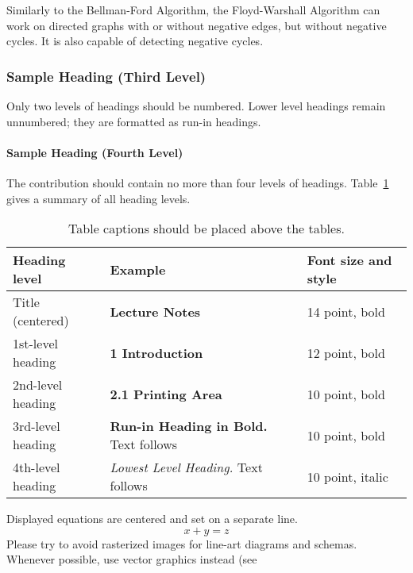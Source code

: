 \documentclass[runningheads]{llncs}
\begin{document}
Similarly to the Bellman-Ford Algorithm, the Floyd-Warshall Algorithm can work on directed graphs with or without negative edges, but without negative cycles. It is also capable of detecting negative cycles.

\subsubsection{Sample Heading (Third Level)} Only two levels of
headings should be numbered. Lower level headings remain unnumbered;
they are formatted as run-in headings.

\paragraph{Sample Heading (Fourth Level)}
The contribution should contain no more than four levels of
headings. Table~\ref{tab1} gives a summary of all heading levels.

\begin{table}
\caption{Table captions should be placed above the
tables.}\label{tab1}
\begin{tabular}{|l|l|l|}
\hline
Heading level &  Example & Font size and style\\
\hline
Title (centered) &  {\Large\bfseries Lecture Notes} & 14 point, bold\\
1st-level heading &  {\large\bfseries 1 Introduction} & 12 point, bold\\
2nd-level heading & {\bfseries 2.1 Printing Area} & 10 point, bold\\
3rd-level heading & {\bfseries Run-in Heading in Bold.} Text follows & 10 point, bold\\
4th-level heading & {\itshape Lowest Level Heading.} Text follows & 10 point, italic\\
\hline
\end{tabular}
\end{table}


\noindent Displayed equations are centered and set on a separate
line.
\begin{equation}
x + y = z
\end{equation}
Please try to avoid rasterized images for line-art diagrams and
schemas. Whenever possible, use vector graphics instead (see
\end{document}
